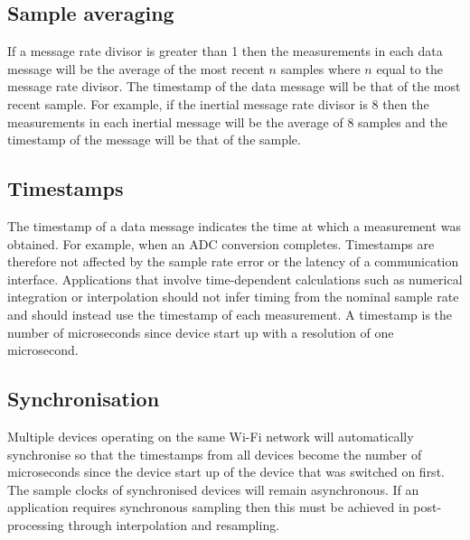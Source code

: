 \subsection{Sample averaging}

If a message rate divisor is greater than 1 then the measurements in each data message will be the average of the most recent $n$ samples where $n$ equal to the message rate divisor.  The timestamp of the data message will be that of the most recent sample.  For example, if the inertial message rate divisor is 8 then the measurements in each inertial message will be the average of 8 samples and the timestamp of the message will be that of the  sample.

\subsection{Timestamps}

The timestamp of a data message indicates the time at which a measurement was obtained.  For example, when an \ac{ADC} conversion completes.  Timestamps are therefore not affected by the sample rate error or the latency of a communication interface.  Applications that involve time-dependent calculations such as numerical integration or interpolation should not infer timing from the nominal sample rate and should instead use the timestamp of each measurement.  A timestamp is the number of microseconds since device start up with a resolution of one microsecond.

\subsection{Synchronisation}

Multiple devices operating on the same Wi-Fi network will automatically synchronise so that the timestamps from all devices become the number of microseconds since the device start up of the device that was switched on first.  The sample clocks of synchronised devices will remain asynchronous.  If an application requires synchronous sampling then this must be achieved in post-processing through interpolation and resampling.
